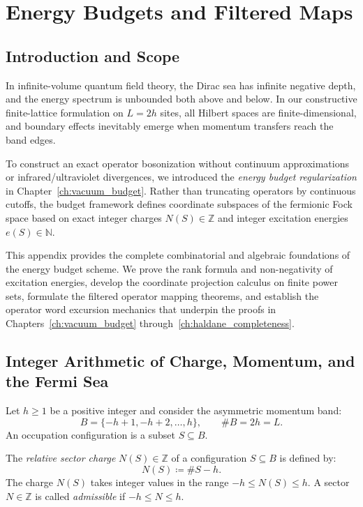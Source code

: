 \chapter{Energy Budgets and Filtered Maps}
\label{app:energy_budgets}

\section{Introduction and Scope}

In infinite-volume quantum field theory, the Dirac sea has infinite negative depth, and the energy spectrum is unbounded both above and below. In our constructive finite-lattice formulation on $L = 2h$ sites, all Hilbert spaces are finite-dimensional, and boundary effects inevitably emerge when momentum transfers reach the band edges.

To construct an exact operator bosonization without continuum approximations or infrared/ultraviolet divergences, we introduced the \emph{energy budget regularization} in Chapter~\ref{ch:vacuum_budget}. Rather than truncating operators by continuous cutoffs, the budget framework defines coordinate subspaces of the fermionic Fock space based on exact integer charges $N(S) \in \mathbb{Z}$ and integer excitation energies $e(S) \in \mathbb{N}$.

This appendix provides the complete combinatorial and algebraic foundations of the energy budget scheme. We prove the rank formula and non-negativity of excitation energies, develop the coordinate projection calculus on finite power sets, formulate the filtered operator mapping theorems, and establish the operator word excursion mechanics that underpin the proofs in Chapters~\ref{ch:vacuum_budget} through~\ref{ch:haldane_completeness}.

\section{Integer Arithmetic of Charge, Momentum, and the Fermi Sea}

Let $h \ge 1$ be a positive integer and consider the asymmetric momentum band:
\begin{equation}
B = \{-h+1, -h+2, \dots, h\}, \qquad \#B = 2h = L.
\end{equation}
An occupation configuration is a subset $S \subseteq B$.

\begin{definition}
The \emph{relative sector charge} $N(S) \in \mathbb{Z}$ of a configuration $S \subseteq B$ is defined by:
\begin{equation}
N(S) \coloneqq \#S - h.
\end{equation}
The charge $N(S)$ takes integer values in the range $-h \le N(S) \le h$.
A sector $N \in \mathbb{Z}$ is called \emph{admissible} if $-h \le N \le h$.
\end{definition}

